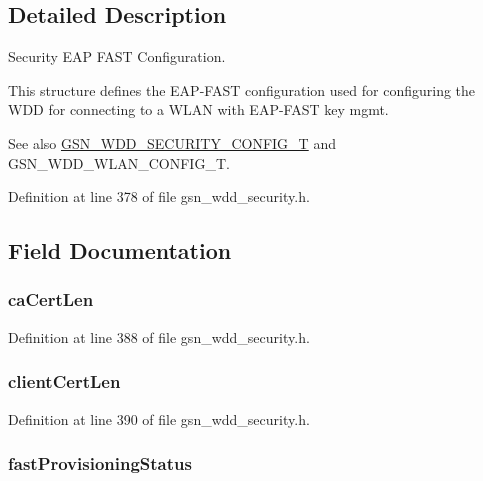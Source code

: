 \subsection{Detailed Description}
Security EAP FAST Configuration. 

This structure defines the EAP-\/FAST configuration used for configuring the WDD for connecting to a WLAN with EAP-\/FAST key mgmt. \begin{DoxySeeAlso}{See also}
\hyperlink{a00604_ab50f348fec494c964d4301472eee16de}{GSN\_\-WDD\_\-SECURITY\_\-CONFIG\_\-T} and GSN\_\-WDD\_\-WLAN\_\-CONFIG\_\-T. 
\end{DoxySeeAlso}


Definition at line 378 of file gsn\_\-wdd\_\-security.h.



\subsection{Field Documentation}
\hypertarget{a00287_a91a9fb29070a3ee80937f9e601dc2335}{
\subsubsection[{caCertLen}]{ {\bf caCertLen}}}
\label{a00287_a91a9fb29070a3ee80937f9e601dc2335}


Definition at line 388 of file gsn\_\-wdd\_\-security.h.

\hypertarget{a00287_ac5992c4484c851247e76e7a2dc9af875}{
\subsubsection[{clientCertLen}]{ {\bf clientCertLen}}}
\label{a00287_ac5992c4484c851247e76e7a2dc9af875}


Definition at line 390 of file gsn\_\-wdd\_\-security.h.

\hypertarget{a00287_a4dc9193a014ae4c6113a2e44bc50c9a6}{
\subsubsection[{fastProvisioningStatus}]{ {\bf fastProvisioningStatus}}}
\label{a00287_a4dc9193a014ae4c6113a2e44bc50c9a6}


